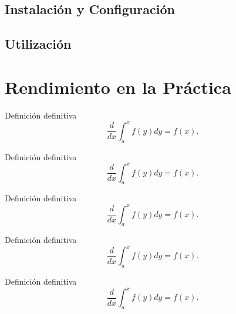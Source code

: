 \subsection{Instalación y Configuración}
\subsection{Utilización}

\section{Rendimiento en la Práctica}

\begin{defn} Definición definitiva $$\frac{d}{dx}\int_a^xf(y)dy=f(x).$$\end{defn}

\begin{teo} Definición definitiva $$\frac{d}{dx}\int_a^xf(y)dy=f(x).$$\end{teo}

\begin{prop} Definición definitiva $$\frac{d}{dx}\int_a^xf(y)dy=f(x).$$\end{prop}

\begin{obs} Definición definitiva $$\frac{d}{dx}\int_a^xf(y)dy=f(x).$$\end{obs}

\begin{ej} Definición definitiva $$\frac{d}{dx}\int_a^xf(y)dy=f(x).$$\end{ej}